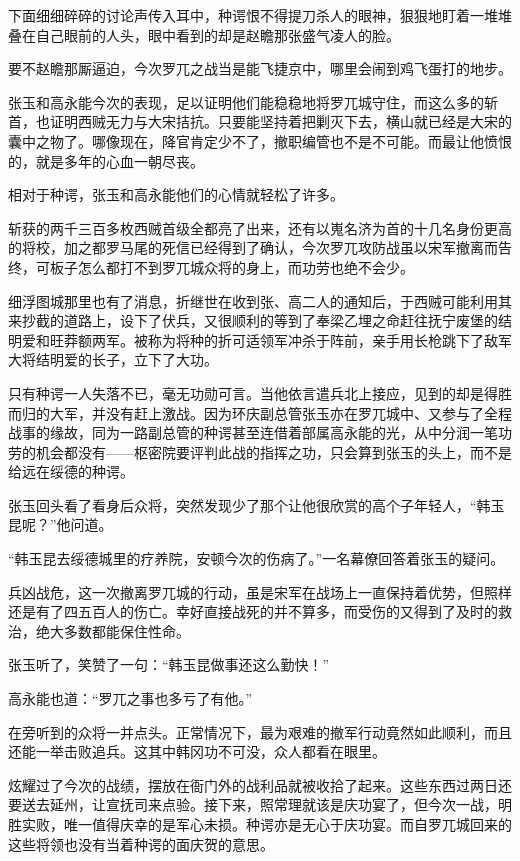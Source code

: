 下面细细碎碎的讨论声传入耳中，种谔恨不得提刀杀人的眼神，狠狠地盯着一堆堆叠在自己眼前的人头，眼中看到的却是赵瞻那张盛气凌人的脸。

要不赵瞻那厮逼迫，今次罗兀之战当是能飞捷京中，哪里会闹到鸡飞蛋打的地步。

张玉和高永能今次的表现，足以证明他们能稳稳地将罗兀城守住，而这么多的斩首，也证明西贼无力与大宋拮抗。只要能坚持着把剿灭下去，横山就已经是大宋的囊中之物了。哪像现在，降官肯定少不了，撤职编管也不是不可能。而最让他愤恨的，就是多年的心血一朝尽丧。

相对于种谔，张玉和高永能他们的心情就轻松了许多。

斩获的两千三百多枚西贼首级全都亮了出来，还有以嵬名济为首的十几名身份更高的将校，加之都罗马尾的死信已经得到了确认，今次罗兀攻防战虽以宋军撤离而告终，可板子怎么都打不到罗兀城众将的身上，而功劳也绝不会少。

细浮图城那里也有了消息，折继世在收到张、高二人的通知后，于西贼可能利用其来抄截的道路上，设下了伏兵，又很顺利的等到了奉梁乙埋之命赶往抚宁废堡的结明爱和旺莽额两军。被称为将种的折可适领军冲杀于阵前，亲手用长枪跳下了敌军大将结明爱的长子，立下了大功。

只有种谔一人失落不已，毫无功勋可言。当他依言遣兵北上接应，见到的却是得胜而归的大军，并没有赶上激战。因为环庆副总管张玉亦在罗兀城中、又参与了全程战事的缘故，同为一路副总管的种谔甚至连借着部属高永能的光，从中分润一笔功劳的机会都没有——枢密院要评判此战的指挥之功，只会算到张玉的头上，而不是给远在绥德的种谔。

张玉回头看了看身后众将，突然发现少了那个让他很欣赏的高个子年轻人，“韩玉昆呢？”他问道。

“韩玉昆去绥德城里的疗养院，安顿今次的伤病了。”一名幕僚回答着张玉的疑问。

兵凶战危，这一次撤离罗兀城的行动，虽是宋军在战场上一直保持着优势，但照样还是有了四五百人的伤亡。幸好直接战死的并不算多，而受伤的又得到了及时的救治，绝大多数都能保住性命。

张玉听了，笑赞了一句：“韩玉昆做事还这么勤快！”

高永能也道：“罗兀之事也多亏了有他。”

在旁听到的众将一并点头。正常情况下，最为艰难的撤军行动竟然如此顺利，而且还能一举击败追兵。这其中韩冈功不可没，众人都看在眼里。

炫耀过了今次的战绩，摆放在衙门外的战利品就被收拾了起来。这些东西过两日还要送去延州，让宣抚司来点验。接下来，照常理就该是庆功宴了，但今次一战，明胜实败，唯一值得庆幸的是军心未损。种谔亦是无心于庆功宴。而自罗兀城回来的这些将领也没有当着种谔的面庆贺的意思。

